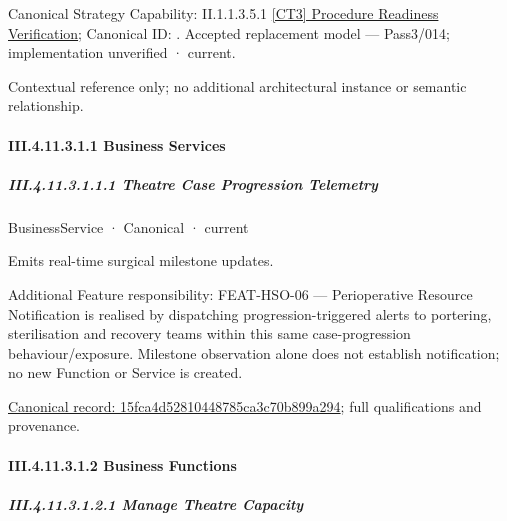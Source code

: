 {\small Canonical Strategy Capability: II.1.1.3.5.1 \hyperref[element:1ba44ca495b74b6fb3a607c39c6672e6]{[CT3] Procedure Readiness Verification}; Canonical ID: \texttt{}. Accepted replacement model — Pass3/014; implementation unverified · current.}\par
Contextual reference only; no additional architectural instance or semantic relationship.\par
\paragraph*{III.4.11.3.1.1 Business Services}
\label{navigation:III.4.11.3.1.1}

\subparagraph*{III.4.11.3.1.1.1 Theatre Case Progression Telemetry}
\label{navigation:III.4.11.3.1.1.1}

\label{element:15fca4d52810448785ca3c70b899a294}
{\small BusinessService · Canonical · current}\par

Emits real-time surgical milestone updates.



Additional Feature responsibility: FEAT-HSO-06 — Perioperative Resource Notification is realised by dispatching progression-triggered alerts to portering, sterilisation and recovery teams within this same case-progression behaviour/exposure. Milestone observation alone does not establish notification; no new Function or Service is created.


{\footnotesize \href{../../../../../../../../continuum/business/business-service/15fca4d52810448785ca3c70b899a294.md}{Canonical record: 15fca4d52810448785ca3c70b899a294}; full qualifications and provenance.}\par
\paragraph*{III.4.11.3.1.2 Business Functions}
\label{navigation:III.4.11.3.1.2}

\subparagraph*{III.4.11.3.1.2.1 Manage Theatre Capacity}
\label{navigation:III.4.11.3.1.2.1}

